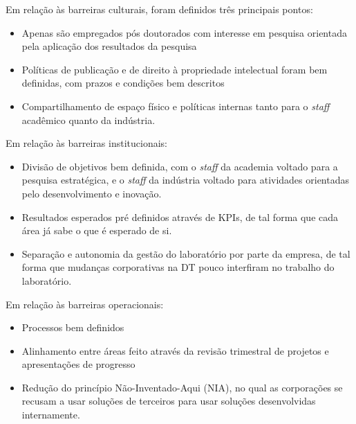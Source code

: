 Em relação às barreiras culturais, foram definidos três principais pontos:
\begin{itemize}
\item Apenas são empregados pós doutorados com interesse em pesquisa orientada pela aplicação dos resultados da pesquisa
\item Políticas de publicação e de direito à propriedade intelectual foram bem definidas, com prazos e condições bem descritos
\item Compartilhamento de espaço físico e políticas internas tanto para o \textit{staff} acadêmico quanto da indústria.
\end{itemize}

Em relação às barreiras institucionais:
\begin{itemize}
\item Divisão de objetivos bem definida, com o \textit{staff} da academia voltado para a pesquisa estratégica, e o \textit{staff} da indústria voltado para atividades orientadas pelo desenvolvimento e inovação.
\item Resultados esperados pré definidos através de KPIs, de tal forma que cada área já sabe o que é esperado de si.
\item Separação e autonomia da gestão do laboratório por parte da empresa, de tal forma que mudanças corporativas na DT pouco interfiram no trabalho do laboratório.
\end{itemize}

Em relação às barreiras operacionais:
\begin{itemize}
\item Processos bem definidos 
\item Alinhamento entre áreas feito através da revisão trimestral de projetos e apresentações de progresso
\item Redução do princípio Não-Inventado-Aqui (NIA), no qual as corporações se recusam a usar soluções de terceiros para usar soluções desenvolvidas internamente.
\end{itemize}
